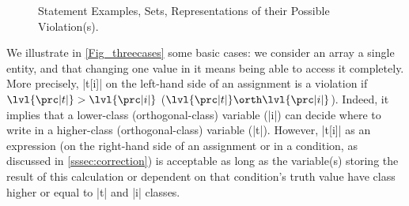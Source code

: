 \begin{figure*}
{\begin{center}
\begin{tabular}{l l c p{40mm}}
\end{tabular}
\end{center}
}
\caption{Statement Examples, Sets, Representations of their Possible %
Violation(s).\label{Fig_threecases}}
\label{fig:dependences}
\end{figure*}

We illustrate in \autoref{Fig_threecases} some basic cases: %
%
we consider an array a single entity, and that changing one value in it means being able to access it completely.
More precisely, \prc|t[i]| on the left-hand side of an assignment is a violation if \(\lvl{\prc|t|} > \lvl{\prc|i|}\) (\resp \(\lvl{\prc|t|} \orth \lvl{\prc|i|}\)). Indeed, it implies that a lower-class (\resp orthogonal-class) variable (\prc|i|) can decide where to write in a higher-class (\resp orthogonal-class) variable (\prc|t|).
However, \prc|t[i]| as an expression (\eg on the right-hand side of an assignment or in a condition, as discussed in \autoref{sssec:correction}) is acceptable as long as the variable(s) storing the result of this calculation or dependent on that condition's truth value have class higher or equal to \prc|t| and \prc|i| classes.

